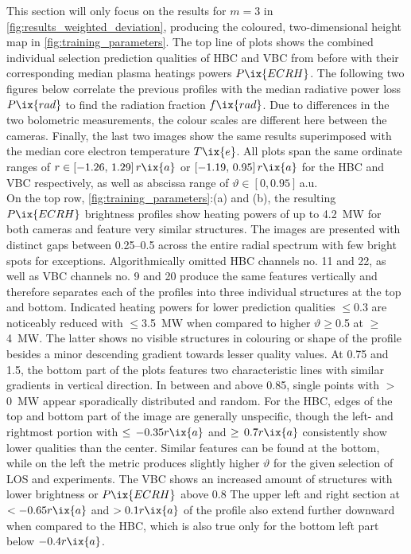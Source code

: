 %
            This section will only focus on the results for $m=3$ in \cref{fig:results_weighted_deviation}, producing the coloured, two-dimensional height map in \cref{fig:training_parameters}. The top line of plots shows the combined individual selection prediction qualities of HBC and VBC from before with their corresponding median plasma heatings powers $P\ix{ECRH}$. The following two figures below correlate the previous profiles with the median radiative power loss $P\ix{rad}$ to find the radiation fraction $f\ix{rad}$. Due to differences in the two bolometric measurements, the colour scales are different here between the cameras. Finally, the last two images show the same results superimposed with the median core electron temperature $T\ix{e}$. All plots span the same ordinate ranges of $r\in\left[-1.26,\,1.29\right]r\ix{a}$ or $\left[-1.19,\,0.95\right]r\ix{a}$ for the HBC and VBC respectively, as well as abscissa range of $\vartheta\in\left[0,0.95\right]$\,a.u.\\%
            On the top row, \cref{fig:training_parameters}:(a) and (b), the resulting $P\ix{ECRH}$ brightness profiles show heating powers of up to \SI{4.2}{\mega\watt} for both cameras and feature very similar structures. The images are presented with distinct gaps between \SIrange{0.25}{0.5}{\arbitraryunit} across the entire radial spectrum with few bright spots for exceptions. Algorithmically omitted HBC channels no. 11 and 22, as well as VBC channels no. 9 and 20 produce the same features vertically and therefore separates each of the profiles into three individual structures at the top and bottom. Indicated heating powers for lower prediction qualities $\le$\SI{0.3}{\arbitraryunit} are noticeably reduced with $\le$\SI{3.5}{\mega\watt} when compared to higher $\vartheta\ge$\SI{0.5}{\arbitraryunit} at $\ge$\SI{4}{\mega\watt}. The latter shows no visible structures in colouring or shape of the profile besides a minor descending gradient towards lesser quality values. At \SI{0.75}{\arbitraryunit} and \SI{1.5}{\arbitraryunit}, the bottom part of the plots features two characteristic lines with similar gradients in vertical direction. In between and above \SI{0.85}{\arbitraryunit}, single points with $>$\SI{0}{\mega\watt} appear sporadically distributed and random. For the HBC, edges of the top and bottom part of the image are generally unspecific, though the left- and rightmost portion with $\le\,-0.35r\ix{a}$ and $\ge\,0.7r\ix{a}$ consistently show lower qualities than the center. Similar features can be found at the bottom, while on the left the metric produces slightly higher $\vartheta$ for the given selection of LOS and experiments. The VBC shows an increased amount of structures with lower brightness or $P\ix{ECRH}$ above \SI{0.8}{\arbitraryunit} The upper left and right section at $<-0.65r\ix{a}$ and $>0.1r\ix{a}$ of the profile also extend further downward when compared to the HBC, which is also true only for the bottom left part below $-0.4r\ix{a}$.\\%
